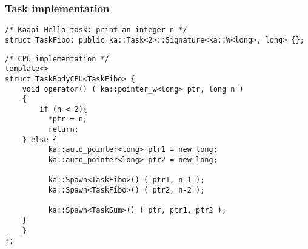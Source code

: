 \begin{frame}[fragile]
  \frametitle{Task implementation}
\begin{block}{}
\begin{lstlisting}
/* Kaapi Hello task: print an integer n */
struct TaskFibo: public ka::Task<2>::Signature<ka::W<long>, long> {};
\end{lstlisting}
\end{block}
%
%
\begin{block}{}
\begin{lstlisting}
/* CPU implementation */
template<>
struct TaskBodyCPU<TaskFibo> {
    void operator() ( ka::pointer_w<long> ptr, long n )
    {
        if (n < 2){ 
          *ptr = n; 
          return;
	} else {
          ka::auto_pointer<long> ptr1 = new long;
          ka::auto_pointer<long> ptr2 = new long;

          ka::Spawn<TaskFibo>() ( ptr1, n-1 );
          ka::Spawn<TaskFibo>() ( ptr2, n-2 );

          ka::Spawn<TaskSum>() ( ptr, ptr1, ptr2 );      
	}
    }
};
\end{lstlisting}
\end{block}
%
%
\end{frame}
